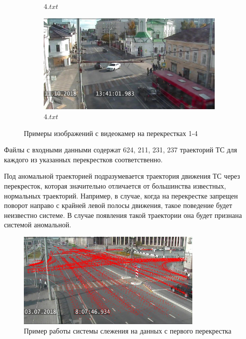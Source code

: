 \begin{figure}[!htb]
\begin{subfigure}[!htb]{0.48\textwidth}
		\caption{$4.txt$}
		\label{fig:is_3}
	\end{subfigure}
	\hfill
	\begin{subfigure}[!htb]{0.48\textwidth}
		\centering{}
		\includegraphics[width=\textwidth]{images/is-4.jpg}
		\caption{$4.txt$}
		\label{fig:is_4}
	\end{subfigure}
	\caption{Примеры изображений с видеокамер на перекрестках 1-4}
	\label{fig:is_all}
\end{figure}

Файлы с входными данными содержат 624, 211, 231, 237 траекторий ТС для каждого из указанных перекрестков соответственно.

Под аномальной траекторией подразумевается траектория движения ТС через перекресток, которая значительно отличается от большинства известных, нормальных траекторий. Например, в случае, когда на перекрестке запрещен поворот направо с крайней левой полосы движения, такое поведение будет неизвестно системе. В случае появления такой траектории она будет признана системой аномальной.

\begin{figure}[!htb]
	\centering{}
	\includegraphics[width=0.8\textwidth]{images/tr-p.png}
	\caption{Пример работы системы слежения на данных с первого перекрестка}
	\label{fig:tr_p}
\end{figure}

